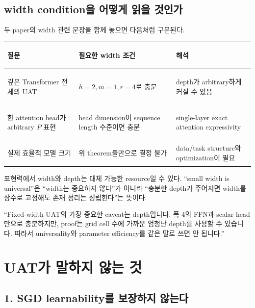 \documentclass[11pt,a4paper,oneside,openany]{memoir}
\theoremstyle{definition}
\begin{document}
\section{width condition을 어떻게 읽을 것인가}

두 paper의 width 관련 문장을 함께 놓으면 다음처럼 구분된다.

\begin{center}
\small
\begin{tabularx}{\textwidth}{>{\bfseries\raggedright\arraybackslash}p{}Y Y}
\toprule
질문 & 필요한 width 조건 & 해석 \\
\midrule
깊은 Transformer 전체의 UAT & $h=2,m=1,r=4$로 충분 & depth가 arbitrary하게 커질 수 있음 \\
한 attention head가 arbitrary $P$ 표현 & head dimension이 sequence length 수준이면 충분 & single-layer exact attention expressivity \\
실제 효율적 모델 크기 & 위 theorem들만으로 결정 불가 & data/task structure와 optimization이 필요 \\
\bottomrule
\end{tabularx}
\end{center}

\begin{keybox}
표현력에서 width와 depth는 대체 가능한 resource일 수 있다.
``small width is universal''은 ``width는 중요하지 않다''가 아니라 ``충분한 depth가 주어지면 width를 상수로 고정해도 존재 정리는 성립한다''는 뜻이다.
\end{keybox}

\begin{presentbox}
``Fixed-width UAT의 가장 중요한 caveat는 depth입니다. 폭 4의 FFN과 scalar head만으로 충분하지만, proof는 grid cell 수에 가까운 엄청난 depth를 사용할 수 있습니다. 따라서 universality와 parameter efficiency를 같은 말로 쓰면 안 됩니다.''
\end{presentbox}

\chapter{UAT가 말하지 않는 것}

\section{1. SGD learnability를 보장하지 않는다}
\end{document}
